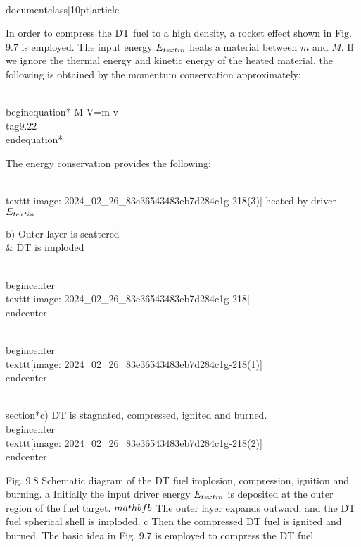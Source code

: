 \\documentclass[10pt]{article}
\begin{document}
{{{{{{In order to compress the DT fuel to a high density, a rocket effect shown in Fig. 9.7 is employed. The input energy $E_{\\text {in }}$ heats a material between $m$ and $M$. If we ignore the thermal energy and kinetic energy of the heated material, the following is obtained by the momentum conservation approximately:


\\begin{equation*}
M V=m v \\tag{9.22}
\\end{equation*}


The energy conservation provides the following:

\\texttt{[image: 2024\_02\_26\_83e36543483eb7d284c1g-218(3)]}
heated by driver $E_{\\text {in }}$

b) Outer layer is scattered \\& DT is imploded

\\begin{center}
\\texttt{[image: 2024\_02\_26\_83e36543483eb7d284c1g-218]}
\\end{center}

\\begin{center}
\\texttt{[image: 2024\_02\_26\_83e36543483eb7d284c1g-218(1)]}
\\end{center}

\\section*{c) DT is stagnated, compressed, ignited and burned.}
\\begin{center}
\\texttt{[image: 2024\_02\_26\_83e36543483eb7d284c1g-218(2)]}
\\end{center}

Fig. 9.8 Schematic diagram of the DT fuel implosion, compression, ignition and burning. a Initially the input driver energy $E_{\\text {in }}$ is deposited at the outer region of the fuel target. $\\mathbf{b}$ The outer layer expands outward, and the DT fuel spherical shell is imploded. c Then the compressed DT fuel is ignited and burned. The basic idea in Fig. 9.7 is employed to compress the DT fuel


}}}}}}
\end{document}
